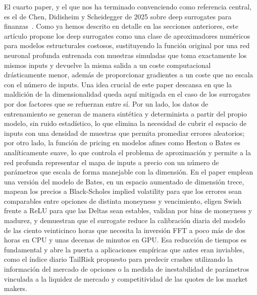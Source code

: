 \documentclass[11pt,a4paper]{article}
\begin{document}
El cuarto paper, y el que nos ha terminado convenciendo como referencia central, es el de Chen, Didisheim y Scheidegger de 2025 sobre deep surrogates para finanzas~\cite{chen2025}. Como ya hemos descrito en detalle en las secciones anteriores, este artículo propone los deep surrogates como una clase de aproximadores numéricos para modelos estructurales costosos, sustituyendo la función original por una red neuronal profunda entrenada con muestras simuladas que toma exactamente los mismos inputs y devuelve la misma salida a un coste computacional drásticamente menor, además de proporcionar gradientes a un coste que no escala con el número de inputs. Una idea crucial de este paper descansa en que la maldición de la dimensionalidad queda aquí mitigada en el caso de los surrogates por dos factores que se refuerzan entre sí. Por un lado, los datos de entrenamiento se generan de manera sintética y determinista a partir del propio modelo, sin ruido estadístico, lo que elimina la necesidad de cubrir el espacio de inputs con una densidad de muestras que permita promediar errores aleatorios; por otro lado, la función de pricing en modelos afines como Heston o Bates es analíticamente suave, lo que controla el problema de aproximación y permite a la red profunda representar el mapa de inputs a precio con un número de parámetros que escala de forma manejable con la dimensión. En el paper emplean una versión del modelo de Bates, en un espacio aumentado de dimensión trece, mapean los precios a Black-Scholes implied volatility para que los errores sean comparables entre opciones de distinta moneyness y vencimiento, eligen Swish frente a ReLU para que las Deltas sean estables, validan por bins de moneyness y madurez, y demuestran que el surrogate reduce la calibración diaria del modelo de las ciento veinticinco horas que necesita la inversión FFT a poco más de dos horas en CPU y unas decenas de minutos en GPU. Esa reducción de tiempos es fundamental y abre la puerta a aplicaciones empíricas que antes eran inviables, como el índice diario TailRisk propuesto para predecir crashes utilizando la información del mercado de opciones o la medida de inestabilidad de parámetros vinculada a la liquidez de mercado y competitividad de las quotes de los market makers.
\end{document}
